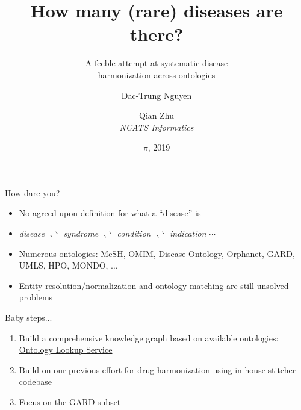 ﻿\documentclass[anchorcolor=blue,linkcolor=blue]{beamer}
\title{How many (rare) diseases are there?}
\subtitle{A feeble attempt at systematic disease\\
  harmonization across ontologies}
\author{Dac-Trung Nguyen\and Qian Zhu\\[1em] \emph{NCATS Informatics}}
\date{{\Large$\pi\!$}, 2019}
\begin{document}
\begin{frame}
  \titlepage
\end{frame}

\begin{frame}
  \begin{block}{How dare you?}
    \begin{itemize}
    \item No agreed upon definition for what a ``disease'' is
    \item \emph{disease} $\rightleftharpoons$ \emph{syndrome}
      $\rightleftharpoons$ \emph{condition} $\rightleftharpoons$
      \emph{indication} $\cdots$
    \item Numerous ontologies: MeSH, OMIM, Disease Ontology, Orphanet,
      GARD, UMLS, HPO, MONDO, $\ldots$
    \item Entity resolution/normalization and ontology matching are
      still unsolved problems
    \end{itemize}
  \end{block}
  \begin{block}{Baby steps...}
    \begin{enumerate}
      \item Build a comprehensive knowledge graph based on available
        ontologies: \href{https://www.ebi.ac.uk/ols/ontologies}{Ontology
          Lookup Service}
      \item Build on our previous effort for
        \href{https://stitcher.ncats.io/app/stitches/latest}{drug harmonization} using
        in-house
        \href{https://spotlite.nih.gov/ncats/stitcher.git}{stitcher} codebase
      \item Focus on the GARD subset
    \end{enumerate}
  \end{block}
\end{frame}
\end{document}
